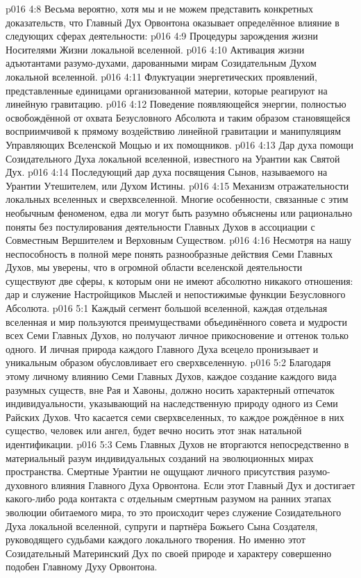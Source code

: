 \vs p016 4:8 \pc Весьма вероятно, хотя мы и не можем представить конкретных доказательств, что Главный Дух Орвонтона оказывает определённое влияние в следующих сферах деятельности:
\vs p016 4:9 Процедуры зарождения жизни Носителями Жизни локальной вселенной.
\vs p016 4:10 Активация жизни адъютантами разумо\hyp{}духами, дарованными мирам Созидательным Духом локальной вселенной.
\vs p016 4:11 Флуктуации энергетических проявлений, представленные единицами организованной материи, которые реагируют на линейную гравитацию.
\vs p016 4:12 Поведение появляющейся энергии, полностью освобождённой от охвата Безусловного Абсолюта и таким образом становящейся восприимчивой к прямому воздействию линейной гравитации и манипуляциям Управляющих Вселенской Мощью и их помощников.
\vs p016 4:13 Дар духа помощи Созидательного Духа локальной вселенной, известного на Урантии как Святой Дух.
\vs p016 4:14 Последующий дар духа посвящения Сынов, называемого на Урантии Утешителем, или Духом Истины.
\vs p016 4:15 Механизм отражательности локальных вселенных и сверхвселенной. Многие особенности, связанные с этим необычным феноменом, едва ли могут быть разумно объяснены или рационально поняты без постулирования деятельности Главных Духов в ассоциации с Совместным Вершителем и Верховным Существом.
\vs p016 4:16 \pc Несмотря на нашу неспособность в полной мере понять разнообразные действия Семи Главных Духов, мы уверены, что в огромной области вселенской деятельности существуют две сферы, к которым они не имеют абсолютно никакого отношения: дар и служение Настройщиков Мыслей и непостижимые функции Безусловного Абсолюта.
\vs p016 5:1 Каждый сегмент большой вселенной, каждая отдельная вселенная и мир пользуются преимуществами объединённого совета и мудрости всех Семи Главных Духов, но получают личное прикосновение и оттенок только одного. И личная природа каждого Главного Духа всецело пронизывает и уникальным образом обусловливает его сверхвселенную.
\vs p016 5:2 Благодаря этому личному влиянию Семи Главных Духов, каждое создание каждого вида разумных существ, вне Рая и Хавоны, должно носить характерный отпечаток индивидуальности, указывающий на наследственную природу одного из Семи Райских Духов. Что касается семи сверхвселенных, то каждое рождённое в них существо, человек или ангел, будет вечно носить этот знак натальной идентификации.
\vs p016 5:3 Семь Главных Духов не вторгаются непосредственно в материальный разум индивидуальных созданий на эволюционных мирах пространства. Смертные Урантии не ощущают личного присутствия разумо\hyp{}духовного влияния Главного Духа Орвонтона. Если этот Главный Дух и достигает какого\hyp{}либо рода контакта с отдельным смертным разумом на ранних этапах эволюции обитаемого мира, то это происходит через служение Созидательного Духа локальной вселенной, супруги и партнёра Божьего Сына Создателя, руководящего судьбами каждого локального творения. Но именно этот Созидательный Материнский Дух по своей природе и характеру совершенно подобен Главному Духу Орвонтона.
